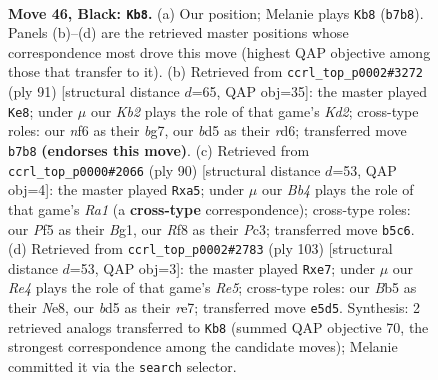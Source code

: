 \documentclass[11pt]{article}
\begin{document}
\clearpage

\begin{figure}[p]\centering
\begin{subfigure}{0.46\textwidth}\centering
\resizebox{\linewidth}{!}{%
\newchessgame
\chessboard[
  setfen={5r2/1k6/5N2/1b1Brp2/1P5R/8/2R3P1/3KN3 b - - 8 46},
  showmover=false,
  pgfstyle=straightmove, color=movearrow, markmove={b7-b8}
]}
\caption{}
\end{subfigure}\hfill
\begin{subfigure}{0.46\textwidth}\centering
\resizebox{\linewidth}{!}{%
\newchessgame
\chessboard[
  setfen={2r5/3k2Bp/3R4/5N1p/1p2P3/3K2P1/rPp5/8 b - - 3 46},
  showmover=false,
  pgfstyle=straightmove, color=movearrow, markmove={d7-e8}
]}
\caption{}
\end{subfigure}
\\[4pt]
\begin{subfigure}{0.46\textwidth}\centering
\resizebox{\linewidth}{!}{%
\newchessgame
\chessboard[
  setfen={8/5r1p/2kn2pP/ppb5/8/2PR4/6K1/R5B1 w - - 1 46},
  showmover=false,
  pgfstyle=straightmove, color=movearrow, markmove={a1-a5}
]}
\caption{}
\end{subfigure}\hfill
\begin{subfigure}{0.46\textwidth}\centering
\resizebox{\linewidth}{!}{%
\newchessgame
\chessboard[
  setfen={4n1k1/R3R3/6p1/8/P2Nr3/KP6/6r1/8 b - - 8 52},
  showmover=false,
  pgfstyle=straightmove, color=movearrow, markmove={e4-e7}
]}
\caption{}
\end{subfigure}
\caption{\textbf{Move 46, Black: \texttt{Kb8}.} (a) Our position; Melanie plays \texttt{Kb8} (\texttt{b7b8}). Panels (b)--(d) are the retrieved master positions whose correspondence most drove this move (highest QAP objective among those that transfer to it). (b) Retrieved from \texttt{ccrl\_top\_p0002\#3272} (ply 91) [structural distance $d$=65, QAP obj=35]: the master played \texttt{Ke8}; under $\mu$ our \emph{Kb2} plays the role of that game's \emph{Kd2}; cross-type roles: our \emph{n}f6 as their \emph{b}g7, our \emph{b}d5 as their \emph{r}d6; transferred move \texttt{b7b8} \textbf{(endorses this move)}. (c) Retrieved from \texttt{ccrl\_top\_p0000\#2066} (ply 90) [structural distance $d$=53, QAP obj=4]: the master played \texttt{Rxa5}; under $\mu$ our \emph{Bb4} plays the role of that game's \emph{Ra1} (a \textbf{cross-type} correspondence); cross-type roles: our \emph{P}f5 as their \emph{B}g1, our \emph{R}f8 as their \emph{P}c3; transferred move \texttt{b5c6}. (d) Retrieved from \texttt{ccrl\_top\_p0002\#2783} (ply 103) [structural distance $d$=53, QAP obj=3]: the master played \texttt{Rxe7}; under $\mu$ our \emph{Re4} plays the role of that game's \emph{Re5}; cross-type roles: our \emph{B}b5 as their \emph{N}e8, our \emph{b}d5 as their \emph{r}e7; transferred move \texttt{e5d5}. Synthesis: 2 retrieved analogs transferred to \texttt{Kb8} (summed QAP objective 70, the strongest correspondence among the candidate moves); Melanie committed it via the \texttt{search} selector.}
\label{fig:thought-m91}
\end{figure}
\end{document}
